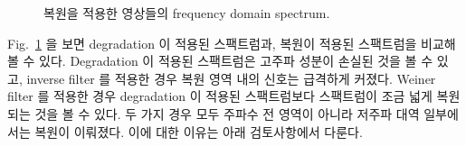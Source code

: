 \documentclass[a4paper, 12p]{paper}
\begin{document}
\begin{figure}[htbp]
{}
\caption{복원을 적용한 영상들의 frequency domain spectrum.}\label{fig:filter_spec}
\end{figure}

Fig.~\ref{fig:filter_spec} 을 보면 degradation 이 적용된 스팩트럼과, 복원이 적용된 스팩트럼을 비교해볼 수 있다. Degradation 이 적용된 스팩트럼은 고주파 성분이 손실된 것을 볼 수 있고, inverse filter 를 적용한 경우 복원 영역 내의 신호는 급격하게 커졌다. Weiner filter 를 적용한 경우 degradation 이 적용된 스팩트럼보다 스팩트럼이 조금 넓게 복원 되는 것을 볼 수 있다. 두 가지 경우 모두 주파수 전 영역이 아니라 저주파 대역 일부에서는 복원이 이뤄졌다. 이에 대한 이유는 아래 검토사항에서 다룬다.
\end{document}
